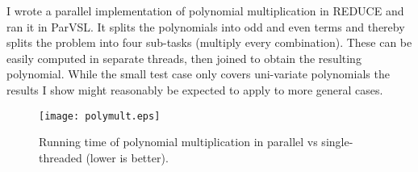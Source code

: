 I wrote a parallel implementation of polynomial multiplication in REDUCE
and ran it in ParVSL. It splits the polynomials into odd and even
terms and thereby splits the problem into four sub-tasks (multiply every combination).
These can be easily computed in separate threads, then joined to obtain the
resulting polynomial. While the small test case only covers uni-variate
polynomials the results I show might reasonably be expected to apply to
more general cases.


\begin{figure}[H]
  \centering
  \texttt{[image: polymult.eps]}
  \caption{Running time of polynomial multiplication in parallel vs single-threaded (lower is better).}
  \label{fig:parpolymult}
\end{figure}



